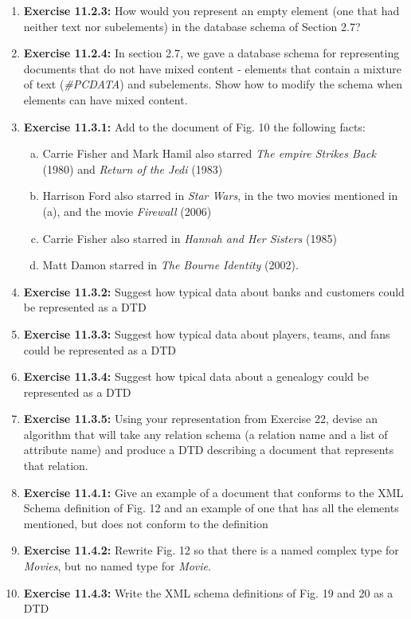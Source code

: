\documentclass[12pt]{article}
\begin{document}
\begin{enumerate}[1.]
    \item \textbf{Exercise 11.2.3:} How would you represent an empty element (one that had
    neither text nor subelements) in the database schema of Section 2.7?

    \item \textbf{Exercise 11.2.4:} In section 2.7, we gave a database schema for representing
    documents that do not have mixed content - elements that contain a mixture
    of text (\textit{\#PCDATA}) and subelements. Show how to modify the schema when
    elements can have mixed content.

    \item \textbf{Exercise 11.3.1:} Add to the document of Fig. 10 the following facts:

    \begin{enumerate}[a)]
        \item Carrie Fisher and Mark Hamil also starred \textit{The empire Strikes Back} (1980)
        and \textit{Return of the Jedi} (1983)
        \item Harrison Ford also starred in \textit{Star Wars}, in the two movies
        mentioned in (a), and the movie \textit{Firewall} (2006)
        \item Carrie Fisher also starred in \textit{Hannah and Her Sisters} (1985)
        \item Matt Damon starred in \textit{The Bourne Identity} (2002).
    \end{enumerate}

    \item \textbf{Exercise 11.3.2:} Suggest how typical data about banks and customers could be
    represented as a DTD

    \item \textbf{Exercise 11.3.3:} Suggest how typical data about players, teams,
    and fans could be represented as a DTD

    \item \textbf{Exercise 11.3.4:} Suggest how tpical data about a genealogy could be represented
    as a DTD

    \item \textbf{Exercise 11.3.5:} Using your representation from Exercise 22, devise an
    algorithm that will take any relation schema (a relation name and a list of attribute name)
    and produce a DTD describing a document that represents that relation.


    \item \textbf{Exercise 11.4.1:} Give an example of a document that conforms to the XML
    Schema definition of Fig. 12 and an example of one that has all the elements mentioned,
    but does not conform to the definition

    \item \textbf{Exercise 11.4.2:} Rewrite Fig. 12 so that there is a named complex type
    for \textit{Movies}, but no named type for \textit{Movie}.

    \item \textbf{Exercise 11.4.3:} Write the XML schema definitions of Fig. 19 and 20 as a DTD

\end{enumerate}
\end{document}
